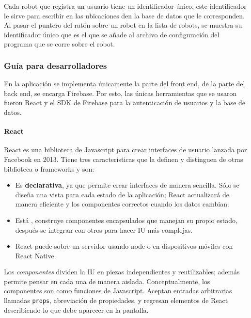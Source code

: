 Cada robot que registra un usuario tiene un identificador único, este identificador
le sirve para escribir en las ubicaciones den la base de datos que le corresponden.
Al pasar el puntero del ratón sobre un robot en la lista de robots, se muestra
su identificador único que es el que se añade al archivo de configuración
del programa que se corre sobre el robot.


\subsubsection{Guía para desarrolladores}
\label{\detokenize{code_docs:documentacion-para-desarrolladores}}\label{\detokenize{code_docs::doc}}
En la aplicación se implementa únicamente la parte del front end, de la parte
del back end, se encarga Firebase. Por esto, las únicas herramientas que se
usaron fueron React y el SDK de Firebase para la autenticación de usuarios y la base
de datos.



\paragraph{React}


React es una biblioteca de Javascript para crear interfaces de usuario
lanzada por Facebook en 2013.
Tiene tres características que la definen y distinguen  de otras
biblioteca o frameworks y son:
\begin{itemize}
\item {} 
Es \textbf{declarativa}, ya que permite crear interfaces de manera sencilla. Sólo se diseña una vista para cada estado de la aplicación; React actualizará de manera eficiente y  los componentes correctos cuando los datos cambian.

\item {} 
Está , construye componentes encapsulados que manejan su propio estado, después se integran con otros para hacer IU más complejas.

\item {} 
React puede  sobre un servidor usando node o en dispositivos móviles con React Native.

\end{itemize}


Los \textit{componentes} dividen la IU en piezas independientes y reutilizables; además
permite pensar en cada una de manera aislada.
Conceptualmente, los componentes son como funciones de Javascript. Aceptan
entradas arbitrarias llamadas \texttt{props}, abreviación de propiedades, y regresan elementos
de React describiendo lo que debe aparecer en la pantalla.

